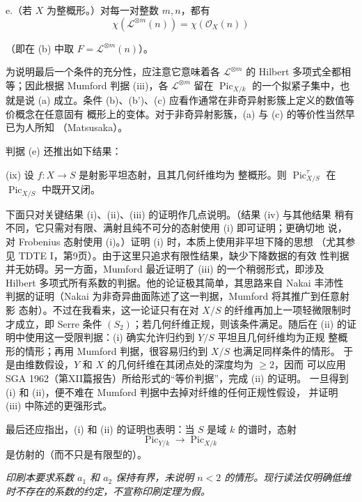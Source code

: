 \noindent e.（若 $X$ 为整概形。）对每一对整数 $m,n$，都有
\[
\chi(\mathcal L^{\otimes m}(n))=\chi(\mathcal O_X(n))
\]

（即在 (b) 中取 $F=\mathcal L^{\otimes m}(n)$）。

为说明最后一个条件的充分性，应注意它意味着各
$\mathcal L^{\otimes m}$ 的 Hilbert 多项式全都相等；因此根据 Mumford
判据 (iii)，各 $\mathcal L^{\otimes m}$ 留在
$\operatorname{Pic}_{X/k}$ 的一个拟紧子集中，也就是说 (a) 成立。条件
(b)、(b')、(c) 应看作通常在非奇异射影簇上定义的数值等价概念在任意固有
概形上的变体。对于非奇异射影簇，(a) 与 (c) 的等价性当然早已为人所知
（Matsusaka）。

判据 (e) 还推出如下结果：

\medskip
\noindent(ix) 设 $f:X\longrightarrow S$ 是射影平坦态射，且其几何纤维均为
整概形。则 $\operatorname{Pic}_{X/S}^\tau$ 在
$\operatorname{Pic}_{X/S}$ 中既开又闭。

下面只对关键结果 (i)、(ii)、(iii) 的证明作几点说明。（结果 (iv) 与其他结果
稍有不同，它只需对有限、满射且纯不可分的态射使用 (i) 即可证明；更确切地
说，对 Frobenius 态射使用 (i)。）证明 (i) 时，本质上使用非平坦下降的思想
（尤其参见 TDTE I，第9页）。由于这里只追求有限性结果，缺少下降数据的有效
性判据并无妨碍。另一方面，Mumford 最近证明了 (iii) 的一个稍弱形式，即涉及
Hilbert 多项式所有系数的判据。他的论证极其简单，其思路来自 Nakai 丰沛性
判据的证明（Nakai 为非奇异曲面陈述了这一判据，Mumford 将其推广到任意射影
态射）。不过在我看来，这一论证只有在对 $X/S$ 的纤维再加上一项轻微限制时
才成立，即 Serre 条件 $(S_2)$；若几何纤维正规，则该条件满足。随后在 (ii)
的证明中使用这一受限判据：(i) 确实允许归约到 $Y/S$ 平坦且几何纤维均为正规
整概形的情形；再用 Mumford 判据，很容易归约到 $X/S$ 也满足同样条件的情形。
于是由维数假设，$Y$ 和 $X$ 的几何纤维在其闭点处的深度均为 $\geq2$，因而
可以应用 SGA 1962（第XII篇报告）所给形式的“等价判据”，完成 (ii) 的证明。
一旦得到 (i) 和 (ii)，便不难在 Mumford 判据中去掉对纤维的任何正规性假设，
并证明 (iii) 中陈述的更强形式。

最后还应指出，(i) 和 (ii) 的证明也表明：当 $S$ 是域 $k$ 的谱时，态射
\[
\operatorname{Pic}_{Y/k}\longrightarrow\operatorname{Pic}_{X/k}
\]
是仿射的（而不只是有限型的）。

\par\smallskip
\begingroup\footnotesize
\noindent\textit{印刷本要求系数 $a_1$ 和 $a_2$ 保持有界，未说明 $n<2$ 的情形。现行读法仅明确低维时不存在的系数的约定，不宣称印刷定理为假。}\par
\endgroup

\par
